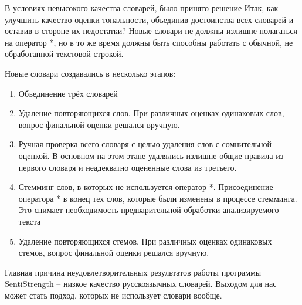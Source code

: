 В условиях невысокого качества словарей, было принято решение
Итак, как улучшить качество оценки тональности, объединив достоинства всех словарей и оставив в стороне их недостатки? Новые словари не должны излишне полагаться на оператор *, но в то же время должны быть способны работать с обычной, не обработанной текстовой строкой.

Новые словари создавались в несколько этапов:
\begin{enumerate}
\item Объединение трёх словарей
\item Удаление повторяющихся слов. При различных оценках одинаковых слов, вопрос финальной оценки решался вручную.
\item Ручная проверка всего словаря с целью удаления слов с сомнительной оценкой. В основном на этом этапе удалялись излишне общие правила из первого словаря и неадекватно оцененные слова из третьего.
\item Стемминг слов, в которых не используется оператор *. Присоединение оператора * в конец тех слов, которые были изменены в процессе стемминга. Это снимает необходимость предварительной обработки анализируемого текста
\item Удаление повторяющихся стемов. При различных оценках одинаковых стемов, вопрос финальной оценки решался вручную.
\end{enumerate}

Главная причина неудовлетворительных результатов работы программы SentiStrength -- низкое качество русскоязычных словарей. Выходом для нас может стать подход, которых не использует словари вообще.

\clearpage
